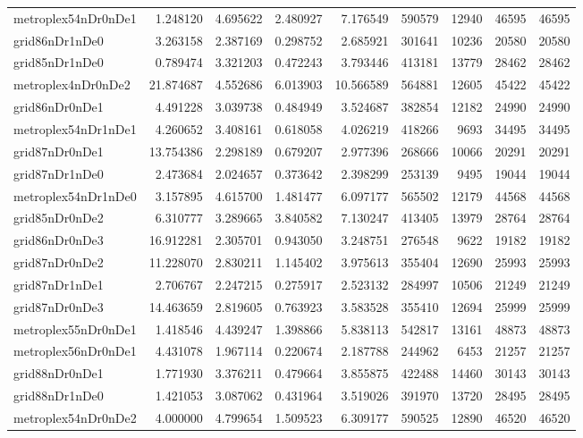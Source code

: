 \documentclass[../../../thesis.tex]{subfiles}
\begin{document}
\begin{longtable}{|l|r|r|r|r|r|r|r|r|}
metroplex54nDr0nDe1 & 1.248120 & 4.695622 & 2.480927 & 7.176549 & 590579 & 12940 & 46595 & 46595 \\
grid86nDr1nDe0 & 3.263158 & 2.387169 & 0.298752 & 2.685921 & 301641 & 10236 & 20580 & 20580 \\
grid85nDr1nDe0 & 0.789474 & 3.321203 & 0.472243 & 3.793446 & 413181 & 13779 & 28462 & 28462 \\
metroplex4nDr0nDe2 & 21.874687 & 4.552686 & 6.013903 & 10.566589 & 564881 & 12605 & 45422 & 45422 \\
grid86nDr0nDe1 & 4.491228 & 3.039738 & 0.484949 & 3.524687 & 382854 & 12182 & 24990 & 24990 \\
metroplex54nDr1nDe1 & 4.260652 & 3.408161 & 0.618058 & 4.026219 & 418266 & 9693 & 34495 & 34495 \\
grid87nDr0nDe1 & 13.754386 & 2.298189 & 0.679207 & 2.977396 & 268666 & 10066 & 20291 & 20291 \\
grid87nDr1nDe0 & 2.473684 & 2.024657 & 0.373642 & 2.398299 & 253139 & 9495 & 19044 & 19044 \\
metroplex54nDr1nDe0 & 3.157895 & 4.615700 & 1.481477 & 6.097177 & 565502 & 12179 & 44568 & 44568 \\
grid85nDr0nDe2 & 6.310777 & 3.289665 & 3.840582 & 7.130247 & 413405 & 13979 & 28764 & 28764 \\
grid86nDr0nDe3 & 16.912281 & 2.305701 & 0.943050 & 3.248751 & 276548 & 9622 & 19182 & 19182 \\
grid87nDr0nDe2 & 11.228070 & 2.830211 & 1.145402 & 3.975613 & 355404 & 12690 & 25993 & 25993 \\
grid87nDr1nDe1 & 2.706767 & 2.247215 & 0.275917 & 2.523132 & 284997 & 10506 & 21249 & 21249 \\
grid87nDr0nDe3 & 14.463659 & 2.819605 & 0.763923 & 3.583528 & 355410 & 12694 & 25999 & 25999 \\
metroplex55nDr0nDe1 & 1.418546 & 4.439247 & 1.398866 & 5.838113 & 542817 & 13161 & 48873 & 48873 \\
metroplex56nDr0nDe1 & 4.431078 & 1.967114 & 0.220674 & 2.187788 & 244962 & 6453 & 21257 & 21257 \\
grid88nDr0nDe1 & 1.771930 & 3.376211 & 0.479664 & 3.855875 & 422488 & 14460 & 30143 & 30143 \\
grid88nDr1nDe0 & 1.421053 & 3.087062 & 0.431964 & 3.519026 & 391970 & 13720 & 28495 & 28495 \\
metroplex54nDr0nDe2 & 4.000000 & 4.799654 & 1.509523 & 6.309177 & 590525 & 12890 & 46520 & 46520 \\

\end{longtable}
\end{document}
